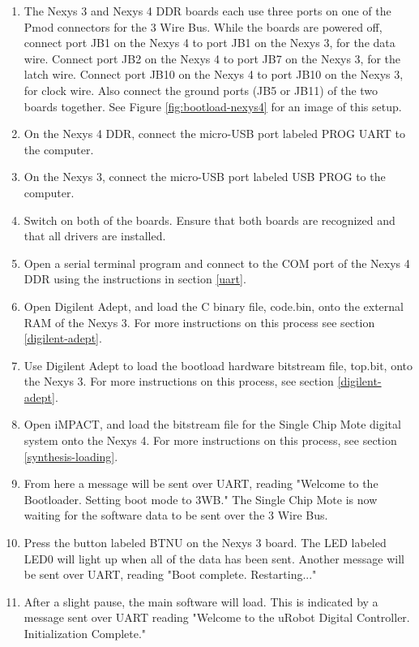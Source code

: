 \begin{enumerate}
	\item The Nexys 3 and Nexys 4 DDR boards each use three ports on one of the Pmod connectors for the 3 Wire Bus. While the boards are powered off, connect port JB1 on the Nexys 4 to port JB1 on the Nexys 3, for the data wire. Connect port JB2 on the Nexys 4 to port JB7 on the Nexys 3, for the latch wire. Connect port JB10 on the Nexys 4 to port JB10 on the Nexys 3, for clock wire. Also connect the ground ports (JB5 or JB11) of the two boards together. See Figure \ref{fig:bootload-nexys4} for an image of this setup.
	\item On the Nexys 4 DDR, connect the micro-USB port labeled PROG UART to the computer.
	\item On the Nexys 3, connect the micro-USB port labeled USB PROG to the computer.
	\item Switch on both of the boards. Ensure that both boards are recognized and that all drivers are installed.
	\item Open a serial terminal program and connect to the COM port of the Nexys 4 DDR using the instructions in section \ref{uart}.
	\item Open Digilent Adept, and load the C binary file, code.bin, onto the external RAM of the Nexys 3. For more instructions on this process see section \ref{digilent-adept}.
	\item Use Digilent Adept to load the bootload hardware bitstream file, top.bit, onto the Nexys 3. For more instructions on this process, see section \ref{digilent-adept}.
	\item Open iMPACT, and load the bitstream file for the Single Chip Mote digital system onto the Nexys 4. For more instructions on this process, see section \ref{synthesis-loading}.
	\item From here a message will be sent over UART, reading "Welcome to the Bootloader. Setting boot mode to 3WB." The Single Chip Mote is now waiting for the software data to be sent over the 3 Wire Bus.
	\item Press the button labeled BTNU on the Nexys 3 board. The LED labeled LED0 will light up when all of the data has been sent. Another message will be sent over UART, reading "Boot complete. Restarting..."
	\item After a slight pause, the main software will load. This is indicated by a message sent over UART reading "Welcome to the uRobot Digital Controller. Initialization Complete."
\end{enumerate}

